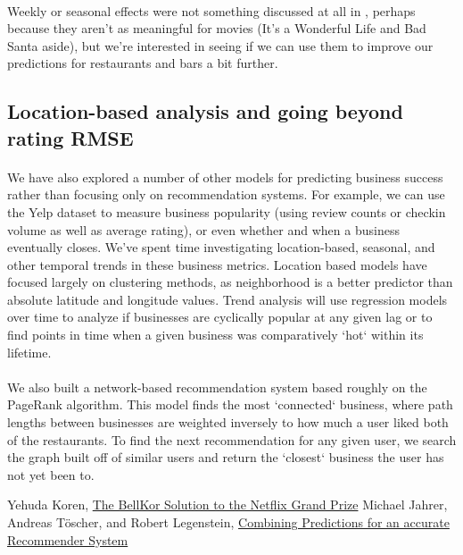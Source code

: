 \documentclass[11pt]{article}
\begin{document}
\paragraph{} Weekly or seasonal effects were not something discussed at all in \cite{koren}, perhaps because they aren't as meaningful for movies (It's a Wonderful Life and Bad Santa aside), but we're interested in seeing if we can use them to improve our predictions for restaurants and bars a bit further.

\subsection*{Location-based analysis and going beyond rating RMSE}

\paragraph{} We have also explored a number of other models for predicting business success rather than focusing only on recommendation systems. For example, we can use the Yelp dataset to measure business popularity (using review counts or checkin volume as well as average rating), or even whether and when a business eventually closes. We've spent time investigating location-based, seasonal, and other temporal trends in these business metrics. Location based models have focused largely on clustering methods, as neighborhood is a better predictor than absolute latitude and longitude values. Trend analysis will use regression models over time to analyze if businesses are cyclically popular at any given lag or to find points in time when a given business was comparatively `hot` within its lifetime.

\paragraph{} We also built a network-based recommendation system based roughly on the PageRank algorithm. This model finds the most `connected` business, where path lengths between businesses are weighted inversely to how much a user liked both of the restaurants. To find the next recommendation for any given user, we search the graph built off of similar users and return the `closest` business the user has not yet been to.

\begin{thebibliography}{9}
  Yehuda Koren,
  \href{http://netflixprize.com/assets/GrandPrize2009_BPC_BellKor.pdf}{The BellKor Solution to the Netflix Grand Prize}
  Michael Jahrer, Andreas Töscher, and Robert Legenstein,
  \href{http://www.igi.tugraz.at/psfiles/JahrerETAL_2010.pdf}{Combining Predictions for an accurate Recommender System}

\end{thebibliography}
\end{document}

